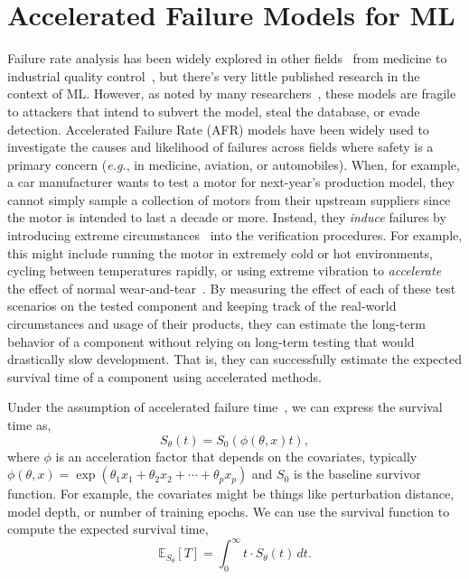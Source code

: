 
\section{Accelerated Failure Models for ML}
\label{afr_models}
Failure rate analysis has been widely explored in other fields~\citep{aft_models} from medicine to industrial quality control~\citep{ai_medical_imaging,ai_industry,ai_aviation,ai_luggage,ai_security,ai_prison}, but there's very little published research in the context of ML. However, as noted by many researchers~\citep{madry2017towards, carlini_towards_2017, croce_reliable_2020, meyers}, these models are fragile to attackers that intend to subvert the model, steal the database, or evade detection.  Accelerated Failure Rate (AFR) models have been widely used to investigate the causes and likelihood of failures across fields where safety is a primary concern (\textit{e.g.}, in medicine, aviation, or automobiles). When, for example, a car manufacturer wants to test a motor for next-year's production model, they cannot simply sample a collection of motors from their upstream suppliers since the motor is intended to last a decade or more. Instead, they \textit{induce} failures by introducing extreme circumstances~\citep{liu2013development,lawless1995methods} into the verification procedures. For example, this might include running the motor in extremely cold or hot environments, cycling between temperatures rapidly, or using extreme vibration to \textit{accelerate} the effect of normal wear-and-tear~\citep{meeker1998accelerated}. By measuring the effect of each of these test scenarios on the tested component and keeping track of the real-world circumstances and usage of their products, they can estimate the long-term behavior of a component without relying on long-term testing that would drastically slow development. That is, they can successfully estimate the expected survival time of a component using accelerated methods. 

Under the assumption of accelerated failure time~\cite{kleinbaum1996survival}, we can express the survival time as,
$$
    S_\theta(t) = S_0(\phi(\theta, x) t),
$$
where $\phi$ is an acceleration factor that depends on the covariates, typically $\phi(\theta, x) = \exp{(\theta_1 x_1 + \theta_2 x_2 + \cdots + \theta_p x_p)}$ and $S_0$ is the baseline survivor function. For example, the covariates might be things like perturbation distance, model depth, or number of training epochs. We can use the survival function to compute the expected survival time,
\[
    \mathbb{E}_{S_\theta}[T] = \int_0^{\infty} t \cdot S_\theta(t) \,dt.
\]

